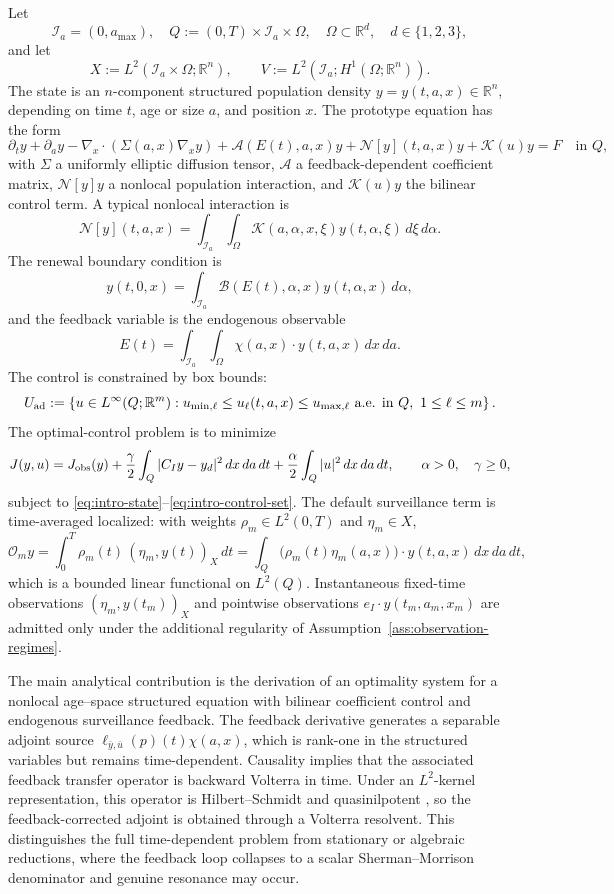 \documentclass[pdflatex,sn-mathphys-num]{sn-jnl}
\theoremstyle{plain}
\theoremstyle{definition}
\theoremstyle{remark}
\newcommand{\R}{\mathbb R}
\begin{document}
Let
\[
\mathcal I_a = (0,a_{\max}),\quad Q:=(0,T)\times\mathcal I_a\times\Omega ,
\quad
\Omega\subset\R^d,\quad d\in\{1,2,3\},
\]
and let
\[
X:=L^2(\mathcal I_a\times\Omega;\R^n),
\qquad
V:=L^2(\mathcal I_a;H^1(\Omega;\R^n)).
\]
The state is an $n$-component structured population density
$y=y(t,a,x)\in\R^n$, depending on time $t$, age or size $a$, and position $x$.
The prototype equation has the form
\begin{equation}
\label{eq:intro-state}
\partial_t y+\partial_a y
-\nabla_x\cdot(\Sigma(a,x)\nabla_x y)
+
\mathcal A(E(t),a,x)y
+
\mathcal N[y](t,a,x)y
+
\mathcal K(u)y
=
F
\quad\text{in }Q,
\end{equation}
with $\Sigma$ a uniformly elliptic diffusion tensor, $\mathcal A$ a feedback-dependent
coefficient matrix, $\mathcal N[y]y$ a nonlocal population interaction, and
$\mathcal K(u)y$ the bilinear control term. A typical nonlocal interaction is
\[
\mathcal N[y](t,a,x)
=
\int_{\mathcal I_a}\int_\Omega
\mathscr K(a,\alpha,x,\xi)y(t,\alpha,\xi)\,d\xi\,d\alpha .
\]
The renewal boundary condition is
\[
y(t,0,x)
=
\int_{\mathcal I_a}
\mathcal B(E(t),\alpha,x)y(t,\alpha,x)\,d\alpha ,
\]
and the feedback variable is the endogenous observable
\[
E(t)
=
\int_{\mathcal I_a}\int_\Omega
\chi(a,x)\cdot y(t,a,x)\,dx\,da .
\]
The control is constrained by box bounds:
\begin{equation}
\label{eq:intro-control-set}
U_{\rm ad}
:=
\left\{
u\in L^\infty(Q;\R^m):
u_{\min,\ell}\le u_\ell(t,a,x)\le u_{\max,\ell}
\ \text{a.e. in }Q,\ 1\le \ell\le m
\right\}.
\end{equation}
The optimal-control problem is to minimize
\[
J(y,u)
=
J_{\rm obs}(y)
+
\frac{\gamma}{2}
\int_Q |C_Iy-y_d|^2\,dx\,da\,dt
+
\frac{\alpha}{2}
\int_Q |u|^2\,dx\,da\,dt,
\qquad \alpha>0,\quad \gamma\ge0,
\]
subject to \eqref{eq:intro-state}--\eqref{eq:intro-control-set}. The default
surveillance term is time-averaged localized: with weights
$\rho_m\in L^2(0,T)$ and $\eta_m\in X$,
\[
\mathcal O_m y
=
\int_0^T\rho_m(t)\,(\eta_m,y(t))_X\,dt
=
\int_Q \big(\rho_m(t)\eta_m(a,x)\big)\cdot y(t,a,x)\,dx\,da\,dt,
\]
which is a bounded linear functional on $L^2(Q)$. Instantaneous fixed-time
observations $(\eta_m,y(t_m))_X$ and pointwise observations
$e_I\cdot y(t_m,a_m,x_m)$ are admitted only under the additional regularity of
Assumption~\ref{ass:observation-regimes}.

The main analytical contribution is the derivation of an optimality system for
a nonlocal age--space structured equation with bilinear coefficient control and
endogenous surveillance feedback. The feedback derivative generates a
separable adjoint source \(\ell_{\bar y,\bar u}(p)(t)\chi(a,x)\), which is
rank-one in the structured variables but remains time-dependent. Causality
implies that the associated feedback transfer operator is backward Volterra in
time. Under an \(L^2\)-kernel representation, this operator is
Hilbert--Schmidt and quasinilpotent \cite{gohberg1970theory,wang2026breakdown}, so the feedback-corrected adjoint is
obtained through a Volterra resolvent. This distinguishes the full
time-dependent problem from stationary or algebraic reductions, where the
feedback loop collapses to a scalar Sherman--Morrison denominator and genuine
resonance may occur.
\end{document}
